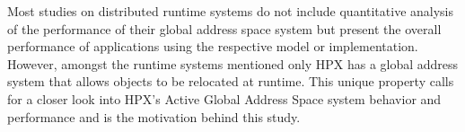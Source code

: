 Most studies on distributed runtime systems do not include quantitative
analysis of the performance of their global address space system but present
the overall performance of applications using the respective model or
implementation. However, amongst the runtime systems mentioned only HPX has a
global address system that allows objects to be relocated at runtime. This
unique property calls for a closer look into HPX's Active Global Address Space
system behavior and performance and is the motivation behind this study.
